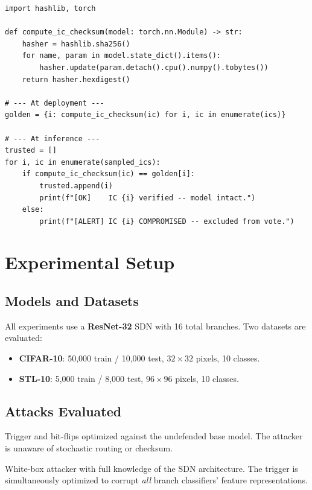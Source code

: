 \documentclass[12pt,a4paper]{article}
\newcommand{\tbt}{\textsc{TBT}}
\newcommand{\sdn}{\textsc{SDN}}
\begin{document}
\begin{lstlisting}[caption={Core checksum generation and IC verification}, label={lst:checksum}]
import hashlib, torch

def compute_ic_checksum(model: torch.nn.Module) -> str:
    hasher = hashlib.sha256()
    for name, param in model.state_dict().items():
        hasher.update(param.detach().cpu().numpy().tobytes())
    return hasher.hexdigest()

# --- At deployment ---
golden = {i: compute_ic_checksum(ic) for i, ic in enumerate(ics)}

# --- At inference ---
trusted = []
for i, ic in enumerate(sampled_ics):
    if compute_ic_checksum(ic) == golden[i]:
        trusted.append(i)
        print(f"[OK]    IC {i} verified -- model intact.")
    else:
        print(f"[ALERT] IC {i} COMPROMISED -- excluded from vote.")
\end{lstlisting}

\section{Experimental Setup}
\label{sec:setup}

\subsection{Models and Datasets}

All experiments use a \textbf{ResNet-32} \sdn{} with 16 total branches. Two datasets are evaluated:
\begin{itemize}
    \item \textbf{CIFAR-10}: 50{,}000 train / 10{,}000 test, $32{\times}32$ pixels, 10 classes.
    \item \textbf{STL-10}: 5{,}000 train / 8{,}000 test, $96{\times}96$ pixels, 10 classes.
\end{itemize}

\subsection{Attacks Evaluated}

\begin{description}[style=nextline]
    \item[Non-Adaptive \tbt{}] Trigger and bit-flips optimized against the undefended base model. The attacker is unaware of stochastic routing or checksum.
    \item[Adaptive \tbt{}] White-box attacker with full knowledge of the \sdn{} architecture. The trigger is simultaneously optimized to corrupt \emph{all} branch classifiers' feature representations.
\end{description}
\end{document}
